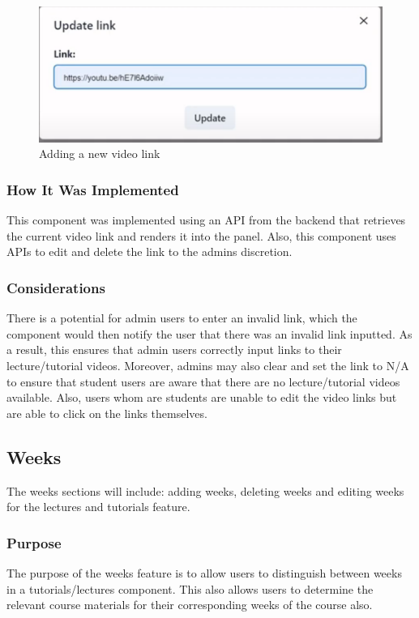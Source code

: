 \begin{figure}[h!]
    \includegraphics[scale=0.3]{images/lat-update-link.png}
    \centering
    \caption{Adding a new video link}
\end{figure}

\subsubsection{How It Was Implemented}
This component was implemented using an API from the backend that retrieves the current video link and renders it into the panel. Also, this component uses APIs to edit and delete the link to the admins discretion.

\subsubsection{Considerations}
There is a potential for admin users to enter an invalid link, which the component would then notify the user that there was an invalid link inputted. As a result, this ensures that admin users correctly input links to their lecture/tutorial videos. Moreover, admins may also clear and set the link to N/A to ensure that student users are aware that there are no lecture/tutorial videos available. Also, users whom are students are unable to edit the video links but are able to click on the links themselves.

\subsection{Weeks}
The weeks sections will include: adding weeks, deleting weeks and editing weeks for the lectures and tutorials feature.

\subsubsection{Purpose}
The purpose of the weeks feature is to allow users to distinguish between weeks in a tutorials/lectures component. This also allows users to determine the relevant course materials for their corresponding weeks of the course also.

